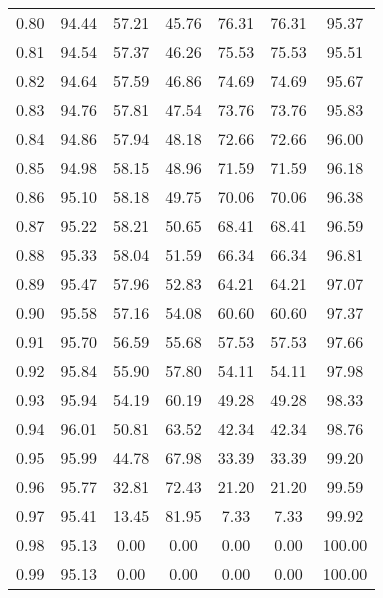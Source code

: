 \begin{tabular}{|c|c|c|c|c|c|c|}
      0.80 &     94.44 &     57.21 &      45.76 &   76.31 &      76.31 &         95.37 \\
      0.81 &     94.54 &     57.37 &      46.26 &   75.53 &      75.53 &         95.51 \\
      0.82 &     94.64 &     57.59 &      46.86 &   74.69 &      74.69 &         95.67 \\
      0.83 &     94.76 &     57.81 &      47.54 &   73.76 &      73.76 &         95.83 \\
      0.84 &     94.86 &     57.94 &      48.18 &   72.66 &      72.66 &         96.00 \\
      0.85 &     94.98 &     58.15 &      48.96 &   71.59 &      71.59 &         96.18 \\
      0.86 &     95.10 &     58.18 &      49.75 &   70.06 &      70.06 &         96.38 \\
      0.87 &     95.22 &     58.21 &      50.65 &   68.41 &      68.41 &         96.59 \\
      0.88 &     95.33 &     58.04 &      51.59 &   66.34 &      66.34 &         96.81 \\
      0.89 &     95.47 &     57.96 &      52.83 &   64.21 &      64.21 &         97.07 \\
      0.90 &     95.58 &     57.16 &      54.08 &   60.60 &      60.60 &         97.37 \\
      0.91 &     95.70 &     56.59 &      55.68 &   57.53 &      57.53 &         97.66 \\
      0.92 &     95.84 &     55.90 &      57.80 &   54.11 &      54.11 &         97.98 \\
      0.93 &     95.94 &     54.19 &      60.19 &   49.28 &      49.28 &         98.33 \\
      0.94 &     96.01 &     50.81 &      63.52 &   42.34 &      42.34 &         98.76 \\
      0.95 &     95.99 &     44.78 &      67.98 &   33.39 &      33.39 &         99.20 \\
      0.96 &     95.77 &     32.81 &      72.43 &   21.20 &      21.20 &         99.59 \\
      0.97 &     95.41 &     13.45 &      81.95 &    7.33 &       7.33 &         99.92 \\
      0.98 &     95.13 &      0.00 &       0.00 &    0.00 &       0.00 &        100.00 \\
      0.99 &     95.13 &      0.00 &       0.00 &    0.00 &       0.00 &        100.00 \\
\bottomrule
\end{tabular}
